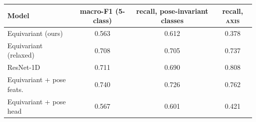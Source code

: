 \begin{tabular}{lccc}
\toprule
Model & macro-F1 (5-class) & recall, pose-invariant classes & recall, \textsc{axis} \\
\midrule
  Equivariant (ours) & 0.563 & 0.612 & 0.378 \\
  Equivariant (relaxed) & 0.708 & 0.705 & 0.737 \\
  ResNet-1D & 0.711 & 0.690 & 0.808 \\
  Equivariant + pose feats. & 0.740 & 0.726 & 0.762 \\
  Equivariant + pose head & 0.567 & 0.601 & 0.421 \\
\bottomrule
\end{tabular}